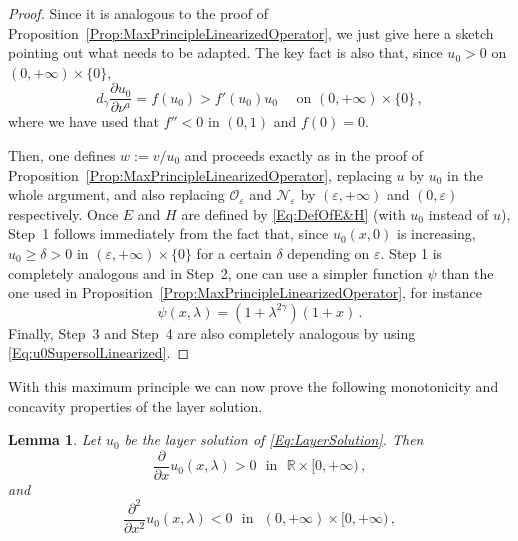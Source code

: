 \documentclass[12pt,reqno]{amsart}
\newtheorem{lemma}[theorem]{Lemma}
\theoremstyle{definition}
\theoremstyle{remark}
\newcommand{\con}[1]{\mathbb{#1}}
\newcommand{\R}{\con{R}} %
\newcommand{\ncal}{\mathcal{N}}
\newcommand{\ocal}{\mathcal{O}}
\newcommand{\s}{\gamma}
\numberwithin{equation}{section}
\begin{document}
\begin{proof}
Since it is analogous to the proof of Proposition~\ref{Prop:MaxPrincipleLinearizedOperator}, we just give here a sketch pointing out what needs to be adapted. The key fact is also that, since $u_0>0$ on $(0,+\infty)\times\{0\}$,
\begin{equation}
\label{Eq:u0SupersolLinearized}
d_\s \dfrac{\partial u_0}{\partial \nu^a}  = f(u_0) > f'(u_0) u_0 \quad \textrm{ on } (0, +\infty)\times \{0\}\,,
\end{equation}
where we have used that $f''<0$ in $(0,1)$ and $f(0)=0$.
 
 
Then, one defines $w := v/u_0$ and proceeds exactly as in the proof of Proposition~\ref{Prop:MaxPrincipleLinearizedOperator}, replacing  $u$ by $u_0$ in the whole argument, and also replacing  $\ocal_\varepsilon$ and $\ncal_\varepsilon$ by $(\varepsilon,+\infty)$ and $(0,\varepsilon)$ respectively. Once $E$ and $H$ are defined by \eqref{Eq:DefOfE&H} (with $u_0$ instead of $u$), Step~1 follows immediately from the fact that, since $u_0(x,0)$ is increasing, $u_0 \geq \delta > 0$ in $(\varepsilon, +\infty)\times \{0\}$ for a certain $\delta$ depending on $\varepsilon$. Step 1 is completely analogous and in Step~2, one can use a simpler function $\psi$ than the one used in Proposition~\ref{Prop:MaxPrincipleLinearizedOperator}, for instance 
$$
\psi(x,\lambda) = (1+\lambda^{2\s})(1+x)\,.
$$
Finally, Step~3 and Step~4 are also completely analogous by using \eqref{Eq:u0SupersolLinearized}.
\end{proof}

With this maximum principle we can now prove the following monotonicity and concavity properties of the layer solution.

\begin{lemma}
\label{Lemma:MonotonicityLayer}
Let $u_0$ be the layer solution of \eqref{Eq:LayerSolution}. Then
$$ \frac{\partial}{\partial x} u_0(x,\lambda) > 0 \ \ \ \text{in} \ \ \ \R\times [0,+\infty)\,, $$
and
$$ \frac{\partial^2}{\partial x^2} u_0(x,\lambda) < 0 \ \ \ \text{in} \ \ \ (0,+\infty)\times [0,+\infty)\,, $$
\end{lemma}
\end{document}
